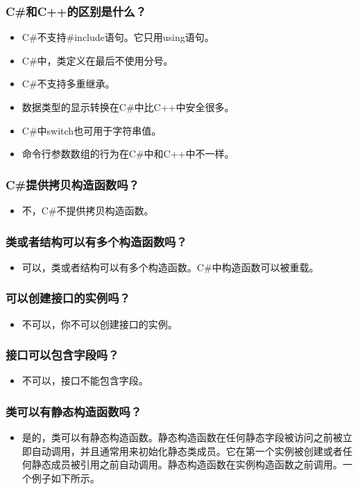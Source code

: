 \documentclass[9pt, b5paper]{article}
\begin{document}
\subsubsection{C\#和C++的区别是什么？}
\label{sec-1-2-34}
\begin{itemize}
\item C\#不支持\#include语句。它只用using语句。
\item C\#中，类定义在最后不使用分号。
\item C\#不支持多重继承。
\item 数据类型的显示转换在C\#中比C++中安全很多。
\item C\#中switch也可用于字符串值。
\item 命令行参数数组的行为在C\#中和C++中不一样。
\end{itemize}
\subsubsection{C\#提供拷贝构造函数吗？}
\label{sec-1-2-35}
\begin{itemize}
\item 不，C\#不提供拷贝构造函数。
\end{itemize}
\subsubsection{类或者结构可以有多个构造函数吗？}
\label{sec-1-2-36}
\begin{itemize}
\item 可以，类或者结构可以有多个构造函数。C\#中构造函数可以被重载。
\end{itemize}
\subsubsection{可以创建接口的实例吗？}
\label{sec-1-2-37}
\begin{itemize}
\item 不可以，你不可以创建接口的实例。
\end{itemize}
\subsubsection{接口可以包含字段吗？}
\label{sec-1-2-38}
\begin{itemize}
\item 不可以，接口不能包含字段。
\end{itemize}
\subsubsection{类可以有静态构造函数吗？}
\label{sec-1-2-39}
\begin{itemize}
\item 是的，类可以有静态构造函数。静态构造函数在任何静态字段被访问之前被立即自动调用，并且通常用来初始化静态类成员。它在第一个实例被创建或者任何静态成员被引用之前自动调用。静态构造函数在实例构造函数之前调用。一个例子如下所示。
\end{itemize}
\end{document}
